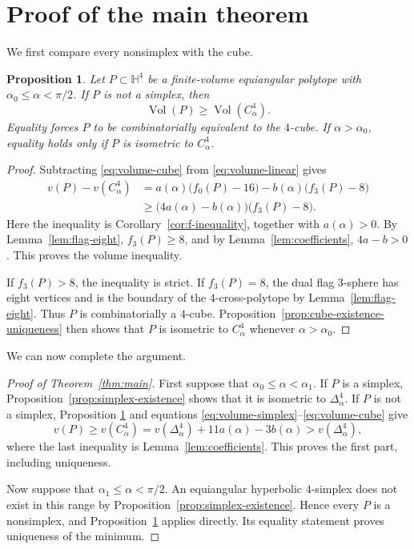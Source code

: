 \documentclass[12pt,a4paper]{article}
\theoremstyle{thmstyleone}
\newtheorem{proposition}[theorem]{Proposition}
\theoremstyle{thmstylethree}
\theoremstyle{thmstyletwo}
\newcommand{\HH}{\mathbb H}
\newcommand{\Vol}{\operatorname{Vol}}
\begin{document}
\section{Proof of the main theorem}\label{sec:proof}

We first compare every nonsimplex with the cube.

\begin{proposition}\label{prop:nonsimplex-cube}
Let $P\subset\HH^4$ be a finite-volume equiangular polytope with
$\alpha_0\leq\alpha<\pi/2$.  If $P$ is not a simplex, then
\[
 \Vol(P)\geq\Vol(C^4_\alpha).
\]
Equality forces $P$ to be combinatorially equivalent to the $4$-cube.  If
$\alpha>\alpha_0$, equality holds only if $P$ is isometric to
$C^4_\alpha$.
\end{proposition}

\begin{proof}
Subtracting \eqref{eq:volume-cube} from \eqref{eq:volume-linear} gives
\begin{align*}
 v(P)-v(C^4_\alpha)
 &=a(\alpha)\bigl(f_0(P)-16\bigr)
   -b(\alpha)\bigl(f_3(P)-8\bigr)\\
 &\geq\bigl(4a(\alpha)-b(\alpha)\bigr)
      \bigl(f_3(P)-8\bigr).
\end{align*}
Here the inequality is Corollary~\ref{cor:f-inequality}, together with
$a(\alpha)>0$.  By Lemma~\ref{lem:flag-eight}, $f_3(P)\geq8$, and by
Lemma~\ref{lem:coefficients}, $4a-b>0$.  This proves the volume inequality.

If $f_3(P)>8$, the inequality is strict.  If $f_3(P)=8$, the dual flag
$3$-sphere has eight vertices and is the boundary of the $4$-cross-polytope
by Lemma~\ref{lem:flag-eight}.  Thus $P$ is combinatorially a $4$-cube.
Proposition~\ref{prop:cube-existence-uniqueness} then shows that $P$ is
isometric to $C^4_\alpha$ whenever $\alpha>\alpha_0$.
\end{proof}

We can now complete the argument.

\begin{proof}[Proof of Theorem~\ref{thm:main}]
First suppose that $\alpha_0\leq\alpha<\alpha_1$.  If $P$ is a simplex,
Proposition~\ref{prop:simplex-existence} shows that it is isometric to
$\Delta^4_\alpha$.  If $P$ is not a simplex, Proposition
\ref{prop:nonsimplex-cube} and equations
\eqref{eq:volume-simplex}--\eqref{eq:volume-cube} give
\[
 v(P)\geq v(C^4_\alpha)
 =v(\Delta^4_\alpha)+11a(\alpha)-3b(\alpha)
 >v(\Delta^4_\alpha),
\]
where the last inequality is Lemma~\ref{lem:coefficients}.  This proves the
first part, including uniqueness.

Now suppose that $\alpha_1\leq\alpha<\pi/2$.  An equiangular hyperbolic
$4$-simplex does not exist in this range by
Proposition~\ref{prop:simplex-existence}.  Hence every $P$ is a nonsimplex,
and Proposition~\ref{prop:nonsimplex-cube} applies directly.  Its equality
statement proves uniqueness of the minimum.
\end{proof}
\end{document}
